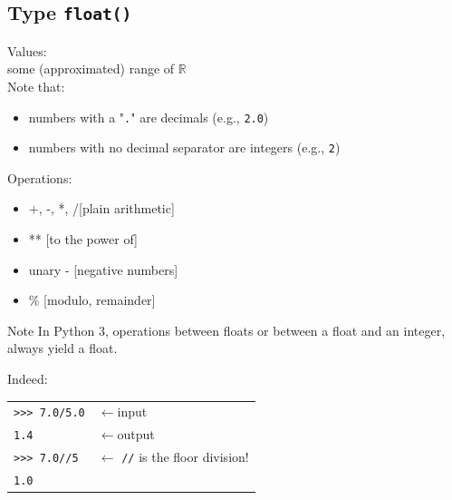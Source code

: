 \documentclass[t,handout,9pt]{beamer}
\begin{document}
\subsection{Type \texttt{float()}}
\begin{frame}
Values:\\
\qquad some (approximated) range of $\mathbb{R}$\\
Note that:\\
\begin{itemize}
	\item numbers with a "\texttt{.}" are decimals (e.g., \texttt{2.0})
	\item numbers with no decimal separator are integers (e.g., \texttt{2})
\end{itemize}
Operations:\\
\begin{itemize}
	\item +, -, *, \slash \hfill [plain arithmetic]
	\item ** \hfill [to the power of]
	\item unary - \hfill [negative numbers]
	\item \% \hfill [modulo, remainder]
\end{itemize}
\begin{block}{Note}
In Python 3, operations between floats or between a float and an integer, always yield a float.
\end{block}
Indeed:
\begin{table}[]
\begin{flushleft}
\begin{tabular}{ll}
\texttt{>{}>{}> 7.0/5.0} & $\leftarrow$input  \\
\texttt{1.4}        & $\leftarrow$output\\
\texttt{>{}>{}> 7.0//5} & $\leftarrow$ \texttt{//} is the floor division!  \\
\texttt{1.0}        & %
\end{tabular}
\end{flushleft}
\end{table}
\end{frame}
%
\end{document}
